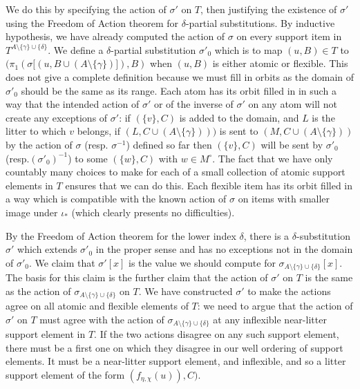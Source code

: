 \documentclass[12pt]{article}
\begin{document}
\begin{enumerate}
We do this by specifying the action of $\sigma'$ on $T$, then justifying the existence of $\sigma'$ using the Freedom of Action theorem for $\delta$-partial substitutions.  By inductive hypothesis, we have already computed the action of $\sigma$ on every support item in $T^{A\setminus \{\gamma\}\cup \{\delta\}}$.
We define a $\delta$-partial substitution $\sigma'_0$ which is to map $(u,B) \in T$ to $(\pi_1(\sigma[(u,B \cup (A \setminus \{\gamma\})]),B)$ when $(u,B)$ is either atomic or flexible.  This does not give a complete definition because we must fill in orbits as the domain
of $\sigma'_0$ should be the same as its range.  Each atom has its orbit filled in in such a way that the intended action of $\sigma'$ or of the inverse of $\sigma'$ on any atom will not create any exceptions of $\sigma'$:  if $(\{v\},C)$ is added to the domain, and $L$ is the litter to which $v$ belongs,
if $(L,C\cup (A \setminus \{\gamma\})))$ is sent to $(M,C \cup (A \setminus \{\gamma\}))$ by the action of $\sigma$ (resp. $\sigma^{-1}$) defined so far then $(\{v\},C)$ will be sent by $\sigma'_0$ (resp.$ (\sigma'_0)^{-1}$) to some $(\{w\},C)$ with $w \in M^\circ$.  The fact that we have only countably many choices to make
for each of a small collection of atomic support elements in $T$ ensures that we can do this.  Each flexible item has its orbit filled in a way which is compatible with the known action of $\sigma$ on items with smaller image under $\iota_*$ (which clearly presents no difficulties).

By the Freedom of Action theorem for the lower index $\delta$, there is a $\delta$-substitution $\sigma'$ which extends $\sigma'_0$ in the proper sense and has no exceptions not in the domain of $\sigma'_0$.  We claim that $\sigma'[x]$ is the value we should compute for $\sigma_{A \setminus \{\gamma\}\cup \{\delta\}}[x]$.
The basis for this claim is the further claim that the action of $\sigma'$ on $T$ is the same as the action of $\sigma_{A\setminus \{\gamma\}\cup \{\delta\}}$ on $T$.  We have constructed $\sigma'$ to make the actions agree on all atomic and flexible elements of $T$:  we need to argue that the action of $\sigma'$ on $T$ must agree with the action of $\sigma_{A \setminus \{\gamma\}\cup \{\delta\}}$ at any inflexible near-litter support element in $T$.  If the two actions disagree on any such support element, there must be a first one on which they disagree in our well ordering of support elements.  It must be a near-litter support element, and inflexible, and so a litter support element of the form $(f_{\eta,\chi}(u)),C)$.


\end{enumerate}
\end{document}
